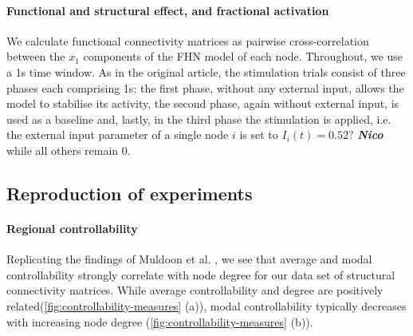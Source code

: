 \paragraph{Functional and structural effect, and fractional activation}
We calculate functional connectivity matrices as pairwise cross-correlation between the $x_1$ components of the FHN model of each node. Throughout, we 
use a 1s time window. As in the original article, the stimulation trials consist of three phases each comprising 1s: the first phase, without any external input, 
allows the model to stabilise its activity, the second phase, again without external input, is used as a baseline and, lastly, in the third phase the stimulation
is applied, i.e. the external input parameter of a single node $i$ is set to $I_i(t)=0.52?$ \textbf{\textit{Nico}} while all others remain 0. 

\subsection{Reproduction of experiments}




\paragraph{Regional controllability}
Replicating the findings of Muldoon et al. \supercite{Muldoon2016}, we see that average and modal controllability strongly correlate with node degree for our
data set of structural connectivity matrices. While average 
controllability and degree are positively related(\ref{fig:controllability-measures} (a)), modal controllability typically decreases with increasing node degree 
(\ref{fig:controllability-measures} (b)).

